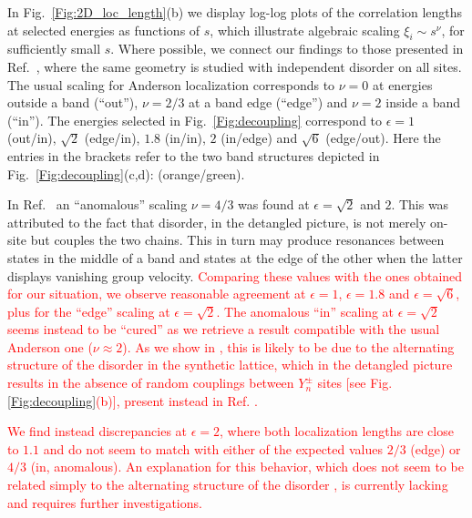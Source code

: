 \documentclass[prl,aps,twocolumn,showpacs,superscriptaddress,longbibliography]{revtex4-1}
\newcommand{\changer}[1]{\textcolor{red}{#1}}
\begin{document}
In Fig.~\ref{Fig:2D_loc_length}(b) we display log-log plots of the correlation lengths at selected energies as functions of $s$, which illustrate algebraic scaling $\xi_i \sim s^\nu$, for sufficiently small $s$. Where possible, we connect our findings to those presented in Ref.~\cite{Leykam2017}, where the same geometry is studied with independent disorder on all sites. The usual scaling for Anderson localization corresponds to $\nu = 0$ at energies outside a band (``out''), $\nu = 2/3$ at a band edge (``edge'') and $\nu = 2$ inside a band (``in''). The energies selected in Fig.~\ref{Fig:decoupling} correspond to $\epsilon =1$ (out/in), $\sqrt{2}$ (edge/in), $1.8$ (in/in), $2$ (in/edge) and $\sqrt{6}$ (edge/out). Here the entries in the brackets refer to the two band structures depicted in Fig.~\ref{Fig:decoupling}(c,d): (orange/green).

In Ref.~\cite{Leykam2017} an ``anomalous'' scaling $\nu = 4/3$ was found at $\epsilon = \sqrt{2}$ and $2$. This was attributed to the fact that disorder, in the detangled picture, is not merely on-site but couples the two chains. This in turn may produce resonances between states in the middle of a band and states at the edge of the other when the latter displays vanishing group velocity. \changer{Comparing these values with the ones obtained for our situation, we observe reasonable agreement at $\epsilon = 1$, $\epsilon = 1.8$ and $\epsilon = \sqrt{6}$, plus for the ``edge'' scaling at $\epsilon = \sqrt{2}$. The anomalous ``in'' scaling at $\epsilon = \sqrt{2}$ seems instead to be ``cured'' as we retrieve a result compatible with the usual Anderson one ($\nu  \approx 2$). As we show in \cite{SM}, this is likely to be due to the alternating structure of the disorder in the synthetic lattice, which in the detangled picture results in the absence of random couplings between $Y_n^{\pm}$ sites [see Fig. \ref{Fig:decoupling}(b)], present instead in Ref. \cite{Leykam2017}.}

\changer{We find instead discrepancies at $\epsilon = 2$, where both localization lengths are close to $1.1$ and do not seem to match with either of the expected values $2/3$ (edge) or $4/3$ (in, anomalous). An explanation for this behavior, which does not seem to be related simply to the alternating structure of the disorder \cite{SM}, is currently lacking and requires further investigations.}
\end{document}
